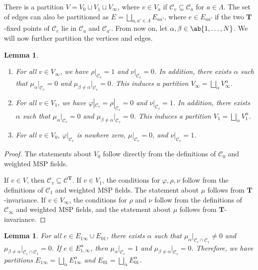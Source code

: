 \documentclass{amsart}
\newtheorem{lem}[thm]{Lemma}
\theoremstyle{definition}
\theoremstyle{remark}
\theoremstyle{plain}
\theoremstyle{definition}
\theoremstyle{remark}
\newcommand{\T}{\mathbf{T}}
\newcommand{\mc}[1]{\mathcal{#1}}
\newcommand{\1}{\mathbf{1}}
\newcommand{\2}{\mathbf{2}}
\newcommand{\3}{\mathbf{3}}
\begin{document}
There is a partition $V = V_0 \sqcup V_1 \sqcup V_{\infty}$, where $v \in V_a$ if $\mc{C}_v \subseteq \mc{C}_a$ for $a \in \Lambda$. The set of edges can also be partitioned as $E = \bigsqcup_{a,a' \in \Lambda} E_{aa'}$, where $e \in E_{aa'}$ if the two $\T$-fixed points of $\mc{C}_e$ lie in $\mc{C}_a$ and $\mc{C}_{a'}$. From now on, let $\alpha, \beta \in \ab\{1,\ldots,N\}$. We will now further partition the vertices and edges.

\begin{lem}\leavevmode
    \begin{enumerate}
        \item For all $v \in V_{\infty}$, we have $\rho|_{\mc{C}_v} = 1$ and $\nu|_{\mc{C}_v} = 0$. In addition, there exists $\alpha$ such that $\mu_{\alpha}|_{\mc{C}_v} = 0$ and $\mu_{\beta \neq \alpha}|_{\mc{C}_v} = 0$. This induces a partition $V_{\infty} = \bigsqcup_{\alpha} V_{\infty}^{\alpha}$.
        \item For all $v \in V_1$, we have $\varphi|_{\mc{C}_v} = \rho|_{\mc{C}_v} = 0$ and $\nu|_{\mc{C}_v} = 1$. In addition, there exists $\alpha$ such that $\mu_{\alpha}|_{\mc{C}_v} = 0$ and $\mu_{\beta \neq \alpha}|_{\mc{C}_v} = 0$. This induces a partition $V_{1} = \bigsqcup_{\alpha} V_{1}^{\alpha}$.
        \item For all $v \in V_0$, $\varphi|_{\mc{C}_v}$ is nowhere zero, $\mu|_{\mc{C}_v} = 0$, and $\nu|_{\mc{C}_v} = 1$.
    \end{enumerate}
\end{lem}

\begin{proof}
    The statements about $V_0$ follow directly from the definitions of $\mc{C}_0$ and weighted MSP fields.

    If $v \in V$, then $\mc{C}_v \subseteq \mc{C}^{\T}$. If $v \in V_1$, the conditions for $\varphi, \rho, \nu$ follow from the definitions of $\mc{C}_1$ and weighted MSP fields. The statement about $\mu$ follows from ${\T}$-invariance. If $v \in V_{\infty}$, the conditions for $\rho$ and $\nu$ follow from the definitions of $\mc{C}_{\infty}$ and weighted MSP fields, and the statement about $\mu$ follows from $\T$-invariance.
\end{proof}

\begin{lem}
    For all $e \in E_{1\infty} \cup E_{01}$, there exists $\alpha$ such that $\mu_{\alpha}|_{\mc{C}_e \cap \mc{C}_1} \neq 0$ and $\mu_{\beta \neq \alpha}|_{\mc{C}_e \cap \mc{C}_1} = 0$. If $e \in E_{1,\infty}^{\alpha}$, then $\mu_{\alpha}|_{\mc{C}_e} = 1$ and $\mu_{\beta \neq \alpha}|_{\mc{C}_e} = 0$. Therefore, we have partitions $E_{1\infty} = \bigsqcup_{\alpha} E_{1\infty}^{\alpha}$ and $E_{01} = \bigsqcup_{\alpha} E_{01}^{\alpha}$.
\end{lem}
\end{document}

